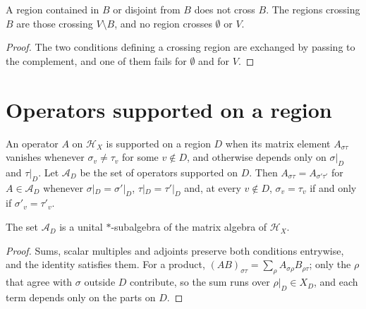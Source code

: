 \begin{lemma}
    \label{lem:sites_crossing_terms}
    \leanok
    A region contained in $B$ or disjoint from $B$ does not cross $B$. The regions
    crossing $B$ are those crossing $V\setminus B$, and no region crosses $\emptyset$
    or $V$.
\end{lemma}
\begin{proof}\leanok
    The two conditions defining a crossing region are exchanged by passing to the
    complement, and one of them fails for $\emptyset$ and for $V$.
\end{proof}

\section{Operators supported on a region}
\label{sec:sites_support}

\begin{definition}
    \label{def:sites_supported}
    \leanok
    An operator $A$ on $\mathcal H_X$ is supported on a region $D$ when its
    matrix element $A_{\sigma\tau}$ vanishes whenever $\sigma_v\neq\tau_v$ for
    some $v\notin D$, and otherwise depends only on $\sigma|_D$ and $\tau|_D$.
    Let $\mathcal A_D$ be the set of operators supported on $D$. Then
    $A_{\sigma\tau}=A_{\sigma'\tau'}$ for $A\in\mathcal A_D$ whenever
    $\sigma|_D=\sigma'|_D$, $\tau|_D=\tau'|_D$ and, at every $v\notin D$,
    $\sigma_v=\tau_v$ if and only if $\sigma'_v=\tau'_v$.
\end{definition}

\begin{theorem}
    \label{thm:sites_supported_subalgebra}
    \leanok
    The set $\mathcal A_D$ is a unital $*$-subalgebra of the matrix algebra of
    $\mathcal H_X$.
\end{theorem}
\begin{proof}\leanok
    Sums, scalar multiples and adjoints preserve both conditions entrywise,
    and the identity satisfies them. For a product,
    $(AB)_{\sigma\tau}=\sum_\rho A_{\sigma\rho}B_{\rho\tau}$; only the $\rho$
    that agree with $\sigma$ outside $D$ contribute, so the sum runs over
    $\rho|_D\in X_D$, and each term depends only on the parts on $D$.
\end{proof}

